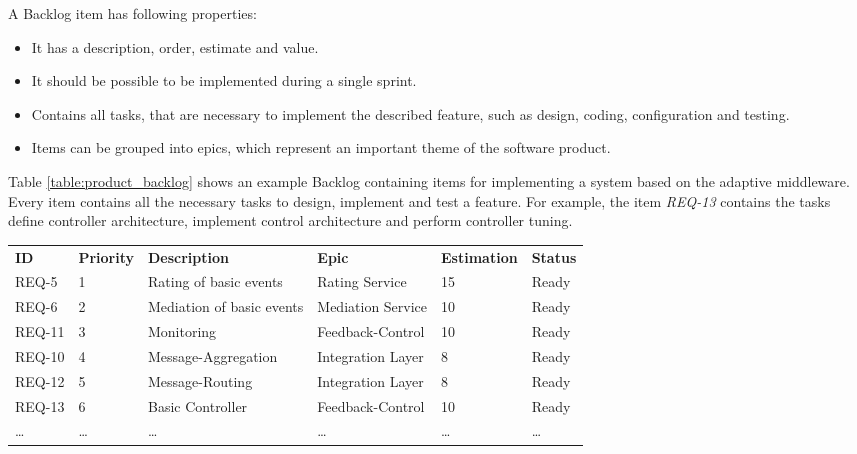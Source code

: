 A Backlog item has following properties:
\begin{itemize}
	\item It has a description, order, estimate and value.
	\item It should be possible to be implemented during a single sprint.
	\item Contains all tasks, that are necessary to implement the described feature, such as design, coding, configuration and testing.
	\item Items can be grouped into epics, which represent an important theme of the software product.
\end{itemize}

Table \ref{table:product_backlog} shows an example Backlog containing items for implementing a system based on the adaptive middleware.
Every item contains all the necessary tasks to design, implement and test a feature. For example, the item \emph{REQ-13} contains the tasks define controller architecture, implement control architecture and perform controller tuning.

\begin{landscape}
	\begin{tabularx}{\columnwidth}{@{} l X X X X X @{}}
		\caption{Example Product Backlog} \label{table:product_backlog}\\
		\toprule
		\bfseries ID & \bfseries Priority & \bfseries Description & \bfseries Epic & \bfseries Estimation & \bfseries Status \\
		REQ-5 & 1 & Rating of basic events & Rating Service & 15 & Ready\\
		REQ-6 & 2 & Mediation of basic events & Mediation Service & 10 & Ready\\
		REQ-11 & 3 & Monitoring & Feedback-Control & 10 & Ready\\
		REQ-10 & 4 & Message-Aggregation & Integration Layer & 8 & Ready\\
		REQ-12 & 5 & Message-Routing & Integration Layer & 8 & Ready\\
		REQ-13 & 6 & Basic Controller & Feedback-Control & 10 & Ready\\
		\ldots & \ldots & \ldots & \ldots & \ldots & \ldots\\
		\bottomrule
	\end{tabularx}
\end{landscape}

